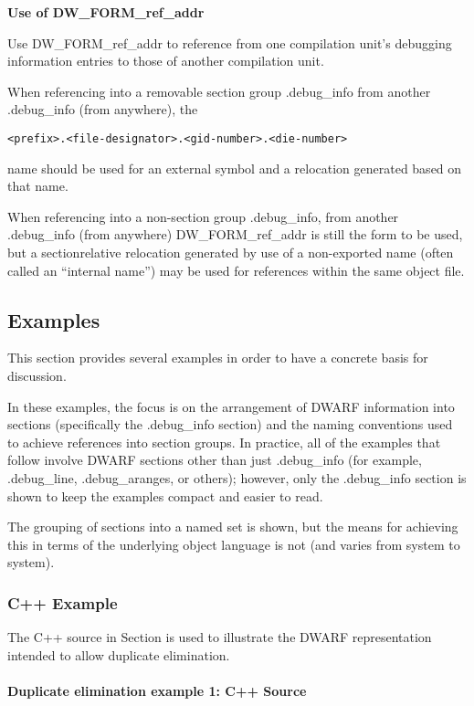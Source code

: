 \textbf{Use of DW\_FORM\_ref\_addr}

Use 
DW\_FORM\_ref\_addr to reference from one compilation
unit's debugging information entries to those of another
compilation unit.

When referencing into a removable section group .debug\_info
from another .debug\_info (from anywhere), the
\begin{alltt}
<prefix>.<file-designator>.<gid-number>.<die-number>
\end{alltt}
name should be used for an external symbol and a relocation
generated based on that name.

When referencing into a non-section group .debug\_info,
from another .debug\_info (from anywhere) 
DW\_FORM\_ref\_addr is
still the form to be used, but a section\dash relative relocation
generated by use of a non-exported name (often called an
``internal name'') may be used for references within the
same object file.

\subsection{Examples}
\label{app:examples}

This section provides several examples in order to have a
concrete basis for discussion.

In these examples, the focus is on the arrangement of DWARF
information into sections (specifically the .debug\_info
section) and the naming conventions used to achieve references
into section groups. In practice, all of the examples that
follow involve DWARF sections other than just .debug\_info
(for example, .debug\_line, .debug\_aranges, or others);
however, only the .debug\_info section is shown to keep the
examples compact and easier to read.

The grouping of sections into a named set is shown, but the means for achieving this in terms of
the underlying object language is not (and varies from system to system).

\subsubsection{C++ Example}

The C++ source in 
Section 
is used to illustrate the DWARF
representation intended to allow duplicate elimination.

\paragraph{Duplicate elimination example 1: C++ Source} 
\label{app:duplicateeliminationexample1csource}

